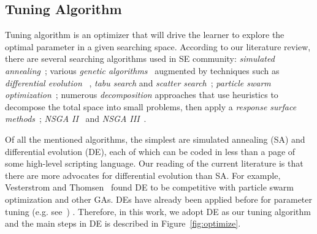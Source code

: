 \documentclass[sigconf,review, anonymous]{acmart}
\theoremstyle{break}
\newcommand{\fig}[1]{Figure~\ref{fig:#1}}
\begin{document}
\subsection{Tuning Algorithm}

Tuning algorithm is an optimizer that will drive the learner to explore
the optimal parameter in a given searching space. According to our
literature review, there are several searching algorithms used in 
SE community:{\em 
simulated annealing}~\cite{feather2002converging,menzies2007data};
 various {\em genetic algorithms}~\cite{jones1996automatic,harman2007current, arcuri2011parameter} augmented by
techniques such as {\em differential evolution}
~\cite{storn1997differential, fu2016tuning, fu2016differential,chaves2015differential,agrawal2016wrong}, 
{\em tabu search} and {\em scatter search}~\cite{beausoleil2006moss,molina2007sspmo,corazza2013using};
{\em particle swarm optimization}~\cite{windisch2007applying}; 
numerous {\em decomposition} approaches that use
    heuristics to decompose the total space into   small problems,   then apply a
    {\em response surface methods}~\cite{krall2015gale};
     {\em NSGA II} ~\cite{zhang2007multi}and {\em NSGA III}~\cite{mkaouer2014high}.


Of all the mentioned algorithms,  the simplest are simulated annealing (SA)  and 
differential evolution (DE), each of which can be coded in less than a page of some high-level scripting language.
 Our reading of the current literature is that there are more  advocates for
differential evolution than SA. For example,  Vesterstrom and Thomsen~\cite{Vesterstrom04} found DE to be competitive with 
 particle swarm optimization and other GAs.  DEs have already been applied before for 
 parameter tuning (e.g. see~\cite{omran2005differential, chiha2012tuning, fu2016tuning, fu2016differential, agrawal2016wrong}) .
Therefore, in this work, we adopt DE as our tuning algorithm and 
the main steps in DE is described in \fig{optimize}.

\end{document}
